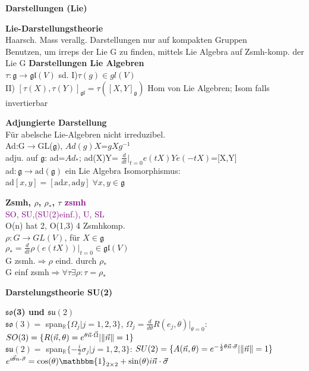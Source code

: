 \documentclass[8pt, a4paper, landscape]{extarticle}
\newcommand{\tit}[1]{\textbf{#1} \\}
\newcommand{\sh}[1]{\small\textbf{#1}}
\newcommand{\hi}[1]{\textcolor{Cerulean}{#1}}
\newcommand{\pu}[1]{\textcolor{purple}{#1}}
\newcommand{\eck}[1]{\mathfrak{#1}}
\begin{document}
\begin{multicols*}{5}
\begin{cbox}
    \sh{Darstellungen (Lie)}
\end{cbox}

\begin{ibox}
    \tit{Lie-Darstellungstheorie}
    Haarsch. Mass verallg. Darstellungen nur auf \hi{kompakten} Gruppen\\
    Benutzen, um irreps der Lie G zu finden, mittels Lie Algebra auf Zsmh-komp. der Lie G
    \textbf{Darstellungen Lie Algebren}\\
   
     $\tau:\eck{g}\rightarrow\eck{gl}(V)$ sd. I)$\tau(g) \in gl(V)$ \\
     II) $[\tau(X),\tau(Y)]_\eck{gl}= \tau([X,Y]_\eck{g})$
    Hom von Lie Algebren; Isom falls invertierbar
\end{ibox}

\begin{ibox}
    \tit{Adjungierte Darstellung}
    Für abelsche Lie-Algebren nicht irreduzibel.\\ 
    Ad:G$\rightarrow$GL($\eck{g})$, $Ad(g)X$=$gXg^{-1}$\\
    adju. auf $\eck{g}$: ad=$Ad_*$; ad(X)Y= $\frac{d}{dt}|_{t=0}e(tX)Ye(-tX)$=[X,Y]\\
    ad$:\eck{g}\rightarrow \text{ad}(\eck{g})$ ein Lie Algebra Isomorphismus:\\ ad$[x,y]=[\text{ad} x, \text{ad} y] \;\forall x,y\in\eck{g}$
\end{ibox}

\begin{ibox}
    \tit{Zsmh, $\rho$, $\rho_*$, $\tau$ \hfill \pu{zsmh}}
    \pu{SO, SU,(SU(2)einf.), U, SL}\\
    O(n) hat 2, O(1,3) 4 Zsmhkomp.\\
    $\rho:G\rightarrow GL(V)$, für $X\in\eck{g}$\\
    $\rho_*=\frac{d}{dt}\rho(e(tX))|_{t=0}\in \eck{gl}(V)$\\
    G zsmh.$\Rightarrow \rho$ eind. durch $\rho_*$\textcolor{green}{\smiley}\\
    G einf zsmh$\Rightarrow\forall\tau\exists\rho:\tau=\rho_*$
    
\end{ibox}




\begin{cbox}
    \sh{Darstelungstheorie SU(2)}
\end{cbox}
\begin{ibox}
\tit{$\eck{so}$(3) und $\eck{su}(2)$}
$\eck{so}(3)=$ span$_\mathbb{R}\{\Omega_j|j=1,2,3\}$, $\Omega_j=\frac{d}{d\theta}R(e_j,\theta)|_{\theta=0}$:\\
{\footnotesize
$SO(3)=\{R(\vec n, \theta)=e^{\theta\vec n\cdot\vec\Omega}| \norm{\vec n}=1\}$\\
}
$\eck{su}(2)=$ span$_\mathbb{R}\{-\frac{i}{2}\sigma_j|j=1,2,3\}$: 
{\footnotesize
$SU(2)=\{A(\vec n, \theta)=e^{-\frac{i}{2}\theta\vec n\cdot\vec\sigma}|\norm{\vec n}=1\}$
}
$e^{i\vec\theta n\cdot\vec\sigma}=\cos(\theta)\mathbbm{1}_{2\times 2}+\sin(\theta)i\vec n\cdot\vec\sigma$


\end{ibox}
\end{multicols*}
\end{document}
